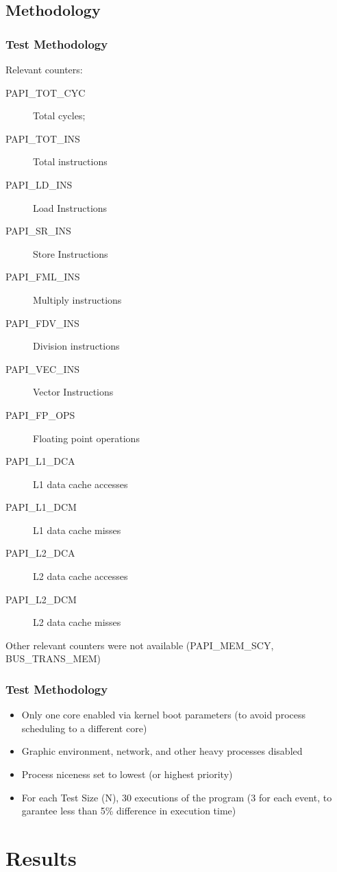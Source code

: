 \documentclass{beamer}
\begin{document}
\subsection{Methodology}
\begin{frame}
	\frametitle{Test Methodology}

	Relevant counters:
	\begin{description}
		\item[PAPI\_TOT\_CYC] Total cycles;
		\item[PAPI\_TOT\_INS] Total instructions
		\item[PAPI\_LD\_INS] Load Instructions
		\item[PAPI\_SR\_INS] Store Instructions
		\item[PAPI\_FML\_INS] Multiply instructions
		\item[PAPI\_FDV\_INS] Division instructions
		\item[PAPI\_VEC\_INS] Vector Instructions
		\item[PAPI\_FP\_OPS] Floating point operations
		\item[PAPI\_L1\_DCA] L1 data cache accesses
		\item[PAPI\_L1\_DCM] L1 data cache misses
		\item[PAPI\_L2\_DCA] L2 data cache accesses
		\item[PAPI\_L2\_DCM] L2 data cache misses
	\end{description}
	Other relevant counters were not available (PAPI\_MEM\_SCY, BUS\_TRANS\_MEM)
\end{frame}

\begin{frame}
	\frametitle{Test Methodology}

	
	\begin{itemize}
		\item Only one core enabled via kernel boot parameters (to avoid process scheduling to a different core)
		\item Graphic environment, network, and other heavy processes disabled
		\item Process niceness set to lowest (or highest priority)
		\item For each Test Size (N), 30 executions of the program (3 for each event, to garantee less than 5\% difference in execution time)
	\end{itemize}

\end{frame}

\section{Results}
\end{document}
